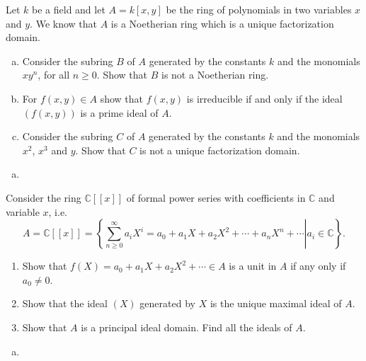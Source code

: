 \documentclass{article}
\newcounter{Problem}
\newenvironment{Problem}{\begin{Exercise}[name={Problem},
                                          counter={Problem}]}
                        {\end{Exercise}}
\begin{document}
\pagebreak

\begin{Problem}
  Let $k$ be a field and let $A = k[x, y]$ be the ring of polynomials in
  two variables $x$ and $y$. We know that $A$ is a Noetherian ring which
  is a unique factorization domain.
  \begin{enumerate}[(a)]
    \item{
      Consider the subring $B$ of $A$ generated by the constants $k$
      and the monomials $xy^n$, for all $n \geq 0$. Show that $B$ is
      not a Noetherian ring.
    }
    \item{
      For $f(x, y) \in A$ show that $f(x, y)$ is irreducible if and
      only if the ideal $(f(x,y))$ is a prime ideal of $A$.
    }
    \item{
      Consider the subring $C$ of $A$ generated by the constants $k$
      and the monomials $x^2$, $x^3$ and $y$. Show that $C$ is not a
      unique factorization domain.
    }
  \end{enumerate}
\end{Problem}

\begin{Answer}
  \begin{enumerate}[(a)]
    \item{
    }
  \end{enumerate}
\end{Answer}

\pagebreak

\begin{Problem}
  Consider the ring $\mathbb{C}[[x]]$ of formal power series with
  coefficients in $\mathbb{C}$ and variable $x$, i.e.
  $$
  A = \mathbb{C}[[x]] =
  \left\{
    \left.
      \sum_{n \geq 0}^\infty a_i X^i
    = a_0 + a_1 X + a_2 X^2 + \cdots + a_n X^n + \cdots
    \right|
      a_i \in \mathbb{C}
  \right\}.
  $$
  \begin{enumerate}
    \item{
      Show that $f(X) = a_0 + a_1 X + a_2 X^2 + \cdots \in A$ is a
      unit in $A$ if any only if $a_0 \neq 0$.
    }
    \item{
      Show that the ideal $(X)$ generated by $X$ is the unique maximal
      ideal of $A$.
    }
    \item{
      Show that $A$ is a principal ideal domain. Find all the ideals
      of $A$.
    }
  \end{enumerate}
\end{Problem}

\begin{Answer}
  \begin{enumerate}[(a)]
    \item{
    }
  \end{enumerate}
\end{Answer}
\end{document}
